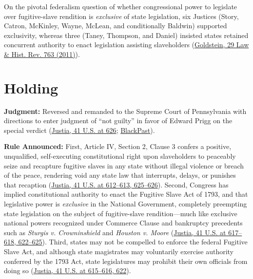 \documentclass[12pt]{article}
\begin{document}
On the pivotal federalism question of whether congressional power to legislate over fugitive-slave rendition is \textit{exclusive} of state legislation, six Justices (Story, Catron, McKinley, Wayne, McLean, and conditionally Baldwin) supported exclusivity, whereas three (Taney, Thompson, and Daniel) insisted states retained concurrent authority to enact legislation assisting slaveholders (\href{https://www.cambridge.org/core/journals/law-and-history-review/article/triumph-of-freedom-after-all-prigg-v-pennsylvania-reexamined/A0B7452002A367E4EFE865A3375F9D0E}{Goldstein, 29 Law \& Hist. Rev. 763 (2011)}).

\section{Holding}
\textbf{Judgment:} Reversed and remanded to the Supreme Court of Pennsylvania with directions to enter judgment of ``not guilty'' in favor of Edward Prigg on the special verdict (\href{https://supreme.justia.com/cases/federal/us/41/539/}{Justia, 41 U.S. at 626}; \href{https://blackpast.org/african-american-history/prigg-v-pennsylvania-1842/}{BlackPast}).

\textbf{Rule Announced:} First, Article IV, Section 2, Clause 3 confers a positive, unqualified, self-executing constitutional right upon slaveholders to peaceably seize and recapture fugitive slaves in any state without illegal violence or breach of the peace, rendering void any state law that interrupts, delays, or punishes that recaption (\href{https://supreme.justia.com/cases/federal/us/41/539/}{Justia, 41 U.S. at 612--613, 625--626}). Second, Congress has implied constitutional authority to enact the Fugitive Slave Act of 1793, and that legislative power is \textit{exclusive} in the National Government, completely preempting state legislation on the subject of fugitive-slave rendition---much like exclusive national powers recognized under Commerce Clause and bankruptcy precedents such as \textit{Sturgis v. Crowninshield} and \textit{Houston v. Moore} (\href{https://supreme.justia.com/cases/federal/us/41/539/}{Justia, 41 U.S. at 617--618, 622--625}). Third, states may not be compelled to enforce the federal Fugitive Slave Act, and although state magistrates may voluntarily exercise authority conferred by the 1793 Act, state legislatures may prohibit their own officials from doing so (\href{https://supreme.justia.com/cases/federal/us/41/539/}{Justia, 41 U.S. at 615--616, 622}).
\end{document}
